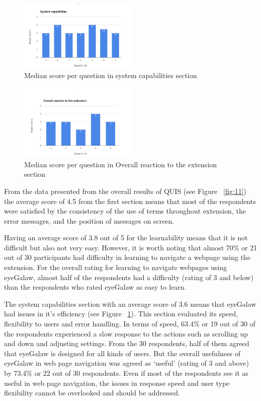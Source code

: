 \documentclass[journal]{./IEEE/IEEEtran}
\begin{document}
\begin{figure}[h!]
  \centering
    \includegraphics[width=0.5\textwidth]{./images/section3.png}
  \caption{Median score per question in  system capabilities  section }
  \label{fig:14}
\end{figure}

\begin{figure}[h!]
  \centering
    \includegraphics[width=0.5\textwidth]{./images/section4.png}
  \caption{Median score per question in Overall reaction to the extension section }
  \label{fig:15}
\end{figure}

From the data presented from the overall results of QUIS (see Figure ~\ref{fig:11}) the average score of 4.5 from the first section means that most of the respondents were satisfied by the consistency of the use of terms throughout extension, the error messages, and the position of messages on screen.  

Having  an average score of 3.8 out of 5 for the learnability means that it is not difficult but also not very easy.  However, it is worth noting that almost 70\% or  21 out of 30 participants had difficulty in learning to navigate a webpage using the extension. For the overall rating for learning to navigate webpages using eyeGalaw, almost half of the respondents had a difficulty (rating of 3 and below) than the respondents who rated eyeGalaw as easy to learn. 

The system capabilities section with an average score of 3.6 means that eyeGalaw had issues in it’s efficiency (see Figure ~\ref{fig:14}). This section evaluated its speed, flexibility to users and error handling. In terms of speed,  63.4\%  or 19 out of  30 of the respondents experienced a slow response to the actions such as scrolling up and down and  adjusting settings. From the 30 respondents, half of them agreed that eyeGalaw is designed for all kinds of users. But the overall usefulness of eyeGalaw in web page navigation was agreed as ‘useful’ (rating of 3 and above)  by 73.4\%  or  22 out of 30 respondents. Even if most of the respondents see it as useful in web page navigation, the issues in response speed and user type flexibility cannot be overlooked and should be addressed. 
\end{document}
